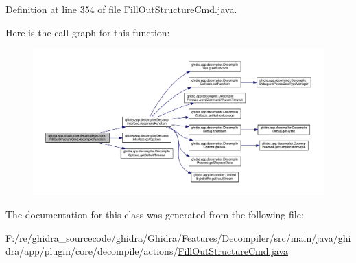 Definition at line 354 of file Fill\+Out\+Structure\+Cmd.\+java.

Here is the call graph for this function\+:
\nopagebreak
\begin{figure}[H]
\begin{center}
\leavevmode
\includegraphics[width=350pt]{classghidra_1_1app_1_1plugin_1_1core_1_1decompile_1_1actions_1_1_fill_out_structure_cmd_ad1fdf8d5d8ee9586bfec86f62469c212_cgraph}
\end{center}
\end{figure}


The documentation for this class was generated from the following file\+:\begin{DoxyCompactItemize}
\item 
F\+:/re/ghidra\+\_\+sourcecode/ghidra/\+Ghidra/\+Features/\+Decompiler/src/main/java/ghidra/app/plugin/core/decompile/actions/\mbox{\hyperlink{_fill_out_structure_cmd_8java}{Fill\+Out\+Structure\+Cmd.\+java}}\end{DoxyCompactItemize}
